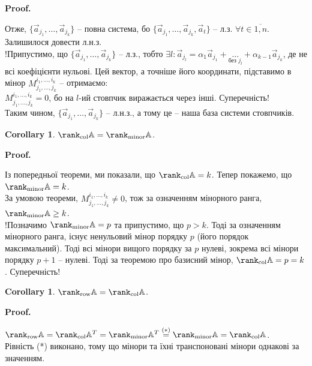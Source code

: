 \documentclass[a4paper, 10pt]{article}
\makeatletter
\theoremstyle{theoremdd}
\newtheorem{corollary}[theorem]{Corollary}
\renewenvironment{proof}[1][Proof.\\]{\par
\pushQED{\hfill \qed}%
\normalfont \topsep6\p@\@plus6\p@\relax
\trivlist
\item\relax
{\bfseries
#1\@addpunct{.}}\hspace\labelsep\ignorespaces
}{%
\popQED\endtrivlist\@endpefalse
}
\makeatother
\begin{document}
\begin{proof}
Отже, $\{\vec{a}_{j_1},\dots,\vec{a}_{j_k}\}$ -- повна система, бо $\{\vec{a}_{j_1},\dots,\vec{a}_{j_k}, \vec{a}_t\}$ -- л.з. $\forall t \in \overline{1,n}$. Залишилося довести л.н.з.\\
!Припустимо, що $\{\vec{a}_{j_1},\dots,\vec{a}_{j_k}\}$ -- л.з., тобто $\exists l: \vec{a}_{j_l} = \alpha_1 \vec{a}_{j_1} + \underset{\text{без }j_l}{\dots} + \alpha_{k-1} \vec{a}_{j_k}$, де не всі коефіцієнти нульові. Цей вектор, а точніше його координати, підставимо в мінор $M_{j_1,\dots,j_k}^{i_1,\dots,i_k}$ -- отримаємо:\\
$M_{j_1,\dots,j_k}^{i_1,\dots,i_k} = 0$, бо на $l$-ий стовпчик виражається через інші. Суперечність!\\
Таким чином, $\{\vec{a}_{j_1},\dots,\vec{a}_{j_k}\}$ -- л.н.з., а тому це -- наша база системи стовпчиків.
\end{proof}

\begin{corollary}
$\rank_{\text{col}} \mathbb{A} = \rank_{\text{minor}} \mathbb{A}$.
\end{corollary}

\begin{proof}
Із попередньої теореми, ми показали, що $\rank_{\text{col}} \mathbb{A} = k$. Тепер покажемо, що $\rank_{\text{minor}} \mathbb{A} = k$.\\
За умовою теореми, $M_{j_1,\dots,j_k}^{i_1,\dots,i_k} \neq 0$, тож за означенням мінорного ранга, $\rank_{\text{minor}} \mathbb{A} \geq k$.\\
!Позначимо $\rank_{\text{minor}} \mathbb{A} = p$ та припустимо, що $p > k$. Тоді за означенням мінорного ранга, існує ненульовий мінор порядку $p$ (його порядок максимальний). Тоді всі мінори вищого порядку за $p$ нулеві, зокрема всі мінори порядку $p+1$ -- нулеві. Тоді за теоремою про базисний мінор, $\rank_{\text{col}} \mathbb{A} = p = k$. Суперечність!
\end{proof}

\begin{corollary}
$\rank_{\textrm{row}} \mathbb{A} = \rank_{\textrm{col}} \mathbb{A}$.
\end{corollary}

\begin{proof}
$\rank_{\textrm{row}} \mathbb{A} = \rank_{\textrm{col}} \mathbb{A}^T = \rank_{\textrm{minor}} \mathbb{A}^T \overset{(*)}{=} \rank_{\textrm{minor}} \mathbb{A} = \rank_{\textrm{col}} \mathbb{A}$.\\
Рівність (*) виконано, тому що мінори та їхні транспоновані мінори однакові за значенням.
\end{proof}
\end{document}
